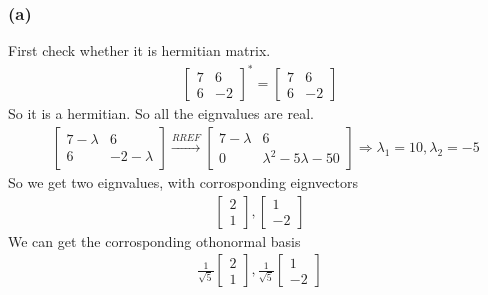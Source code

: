 \documentclass{article}
\begin{document}
\subsubsection*{(a)}
First check whether it is hermitian matrix.
\begin{equation*}
\begin{split}
    \begin{bmatrix}
        7 & 6 \\ 6 & -2
    \end{bmatrix}^* = \begin{bmatrix}
        7 & 6 \\ 6 & -2
    \end{bmatrix}
\end{split}
\end{equation*}
So it is a hermitian. So all the eignvalues are real.
\begin{equation*}
    \begin{split}
        &\begin{bmatrix}
            7 - \lambda& 6  \\ 6  & -2 - \lambda
        \end{bmatrix} \stackrel{RREF}{\longrightarrow} \begin{bmatrix}
            7 - \lambda& 6  \\ 0  &  \lambda ^ 2 - 5 \lambda - 50
        \end{bmatrix} 
        \Rightarrow \lambda_1 = 10, \lambda_2 = -5
    \end{split}
\end{equation*}
So we get two eignvalues, with corrosponding eignvectors\begin{equation*}
    \begin{split}
        \begin{bmatrix}
            2 \\ 1
        \end{bmatrix}, \begin{bmatrix}
            1 \\ -2
        \end{bmatrix}
    \end{split}
\end{equation*}
We can get the corrosponding othonormal basis 
\begin{equation*}
    \begin{split}
        \frac{1}{\sqrt{5}}
        \begin{bmatrix}
            2 \\ 1
        \end{bmatrix},
        \frac{1}{\sqrt{5}}
        \begin{bmatrix}
            1 \\ -2
        \end{bmatrix}
    \end{split}
\end{equation*}
\end{document}
